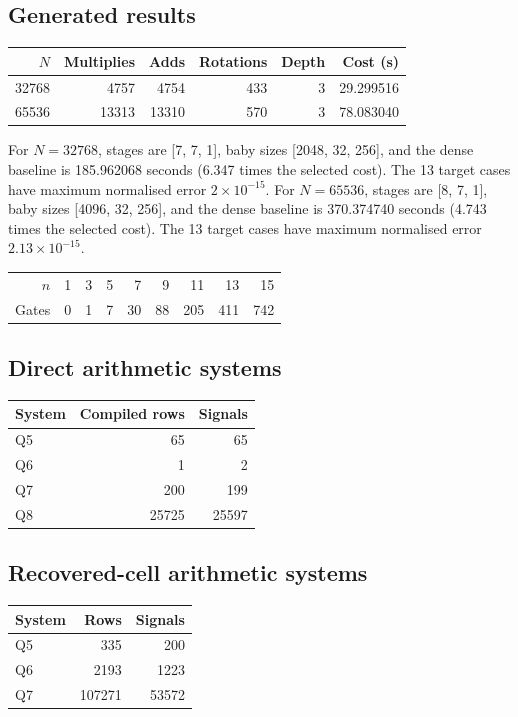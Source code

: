 \subsection*{Generated results}
\begin{center}\begin{tabular}{rrrrrr}\toprule
$N$ & Multiplies & Adds & Rotations & Depth & Cost (s)\\\midrule
32768 & 4757 & 4754 & 433 & 3 & 29.299516\\
65536 & 13313 & 13310 & 570 & 3 & 78.083040\\
\bottomrule\end{tabular}\end{center}
For $N=32768$, stages are [7, 7, 1], baby sizes [2048, 32, 256], and the dense baseline is 185.962068 seconds (6.347 times the selected cost). The 13 target cases have maximum normalised error $2\times 10^{-15}$. 
For $N=65536$, stages are [8, 7, 1], baby sizes [4096, 32, 256], and the dense baseline is 370.374740 seconds (4.743 times the selected cost). The 13 target cases have maximum normalised error $2.13\times 10^{-15}$. 
\begin{center}\begin{tabular}{rrrrrrrrr}\toprule
$n$ & 1 & 3 & 5 & 7 & 9 & 11 & 13 & 15\\
Gates & 0 & 1 & 7 & 30 & 88 & 205 & 411 & 742\\\bottomrule\end{tabular}\end{center}
\subsection*{Direct arithmetic systems}
\begin{center}\begin{tabular}{lrr}\toprule System & Compiled rows & Signals\\\midrule
Q5 & 65 & 65\\
Q6 & 1 & 2\\
Q7 & 200 & 199\\
Q8 & 25725 & 25597\\
\bottomrule\end{tabular}\end{center}
\subsection*{Recovered-cell arithmetic systems}
\begin{center}\begin{tabular}{lrr}\toprule System & Rows & Signals\\\midrule
Q5 & 335 & 200\\
Q6 & 2193 & 1223\\
Q7 & 107271 & 53572\\
\bottomrule\end{tabular}\end{center}

